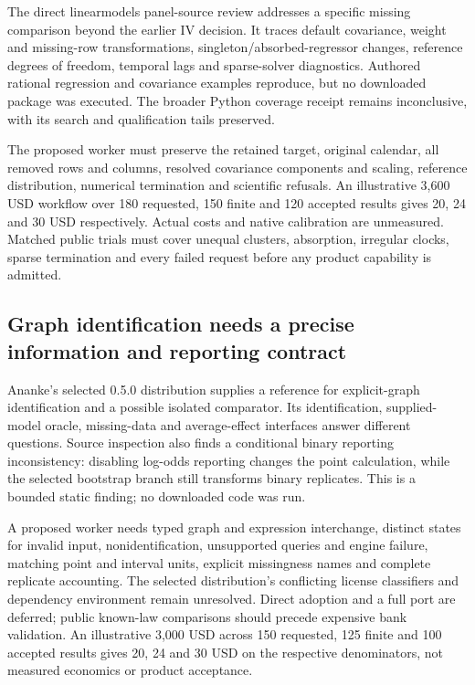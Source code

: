 The direct linearmodels panel-source review addresses a specific missing
comparison beyond the earlier IV decision. It traces default covariance,
weight and missing-row transformations, singleton/absorbed-regressor
changes, reference degrees of freedom, temporal lags and sparse-solver
diagnostics. Authored rational regression and covariance examples
reproduce, but no downloaded package was executed. The broader Python
coverage receipt remains inconclusive, with its search and qualification
tails preserved. \citep{exec24_lmpanel_source,exec24_lmpanel_reference}

The proposed worker must preserve the retained target, original
calendar, all removed rows and columns, resolved covariance components
and scaling, reference distribution, numerical termination and
scientific refusals. An illustrative 3,600 USD workflow over 180
requested, 150 finite and 120 accepted results gives 20, 24 and 30 USD
respectively. Actual costs and native calibration are unmeasured.
Matched public trials must cover unequal clusters, absorption, irregular
clocks, sparse termination and every failed request before any product
capability is admitted. \citep{exec24_lmpanel_reference}

\hypertarget{graph-identification-needs-a-precise-information-and-reporting-contract}{%
\subsection{Graph identification needs a precise information and
reporting
contract}\label{graph-identification-needs-a-precise-information-and-reporting-contract}}

Ananke's selected 0.5.0 distribution supplies a reference for
explicit-graph identification and a possible isolated comparator. Its
identification, supplied-model oracle, missing-data and average-effect
interfaces answer different questions. Source inspection also finds a
conditional binary reporting inconsistency: disabling log-odds reporting
changes the point calculation, while the selected bootstrap branch still
transforms binary replicates. This is a bounded static finding; no
downloaded code was run.
\citep{exec24_ananke_source,exec24_ananke_choice}

A proposed worker needs typed graph and expression interchange, distinct
states for invalid input, nonidentification, unsupported queries and
engine failure, matching point and interval units, explicit missingness
names and complete replicate accounting. The selected distribution's
conflicting license classifiers and dependency environment remain
unresolved. Direct adoption and a full port are deferred; public
known-law comparisons should precede expensive bank validation. An
illustrative 3,000 USD across 150 requested, 125 finite and 100 accepted
results gives 20, 24 and 30 USD on the respective denominators, not
measured economics or product acceptance.\citep{exec24_ananke_choice}

